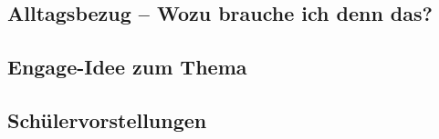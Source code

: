 

\subsection*{Alltagsbezug -- Wozu brauche ich denn das?}




\subsection*{Engage-Idee zum Thema}



\subsection*{Schülervorstellungen}


